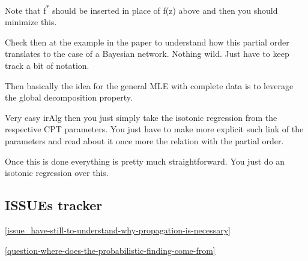 \documentclass[a4paper]{article}
\begin{document}
Note that f\textsuperscript{*} should be inserted in place of f(z) above and then
you should minimize this.

Check then at the example in the paper to understand how this
partial order translates to the case of a Bayesian network. Nothing
wild. Just have to keep track a bit of notation.

Then basically the idea for the general MLE with complete data is
to leverage the global decomposition property.

Very easy irAlg then you just simply take the isotonic regression
from the respective CPT parameters. You just have to make more
explicit such link of the parameters and read about it once more
the relation with the partial order.

Once this is done everything is pretty much straightforward. You
just do an isotonic regression over this.


\subsection{ISSUEs tracker}
\label{sec:org6e9391d}

\ref{issue_have-still-to-understand-why-propagation-is-necessary}

\ref{question-where-does-the-probabilistic-finding-come-from}

\newpage



\end{document}
